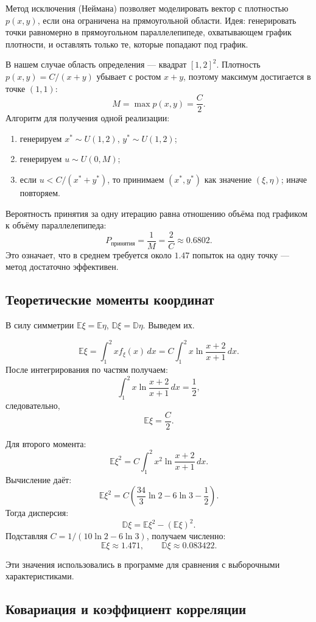 \documentclass[bachelor, och, pract3]{SCWorks}
\begin{document}
Метод исключения (Неймана) позволяет моделировать вектор с плотностью $p(x,y)$, если она ограничена на прямоугольной области. Идея: генерировать точки равномерно в прямоугольном параллелепипеде, охватывающем график плотности, и оставлять только те, которые попадают под график.

В нашем случае область определения — квадрат $[1,2]^2$. Плотность \\ $p(x,y)=C/(x+y)$ убывает с ростом $x+y$, поэтому максимум достигается в точке $(1,1)$:
\[
M = \max p(x,y) = \frac{C}{2}.
\]
Алгоритм для получения одной реализации:
\begin{enumerate}
    \item генерируем $x^* \sim U(1,2)$, $y^* \sim U(1,2)$;
    \item генерируем $u \sim U(0,M)$;
    \item если $u < C/(x^*+y^*)$, то принимаем $(x^*,y^*)$ как значение $(\xi,\eta)$; иначе повторяем.
\end{enumerate}
Вероятность принятия за одну итерацию равна отношению объёма под графиком к объёму параллелепипеда:
\[
P_{\text{принятия}} = \frac{1}{M} = \frac{2}{C} \approx 0.6802.
\]
Это означает, что в среднем требуется около $1.47$ попыток на одну точку — метод достаточно эффективен.

\subsection{Теоретические моменты координат}

В силу симметрии $\mathbb E\xi = \mathbb E\eta$, $\mathbb D\xi = \mathbb D\eta$. Выведем их.

\[
\mathbb E\xi = \int_1^2 x f_\xi(x)\,dx = C\int_1^2 x\ln\frac{x+2}{x+1}\,dx.
\]
После интегрирования по частям получаем:
\[
\int_1^2 x\ln\frac{x+2}{x+1}\,dx = \frac12,
\]
следовательно,
\[
\mathbb E\xi = \frac{C}{2}.
\]

Для второго момента:
\[
\mathbb E\xi^2 = C\int_1^2 x^2\ln\frac{x+2}{x+1}\,dx.
\]
Вычисление даёт:
\[
\mathbb E\xi^2 = C\left(\frac{34}{3}\ln 2 - 6\ln 3 - \frac12\right).
\]
Тогда дисперсия:
\[
\mathbb D\xi = \mathbb E\xi^2 - (\mathbb E\xi)^2.
\]
Подставляя $C = 1/(10\ln2 - 6\ln3)$, получаем численно:
\[
\mathbb E\xi \approx 1.471, \qquad \mathbb D\xi \approx 0.083422.
\]

Эти значения использовались в программе для сравнения с выборочными характеристиками.

\subsection{Ковариация и коэффициент корреляции}
\end{document}
